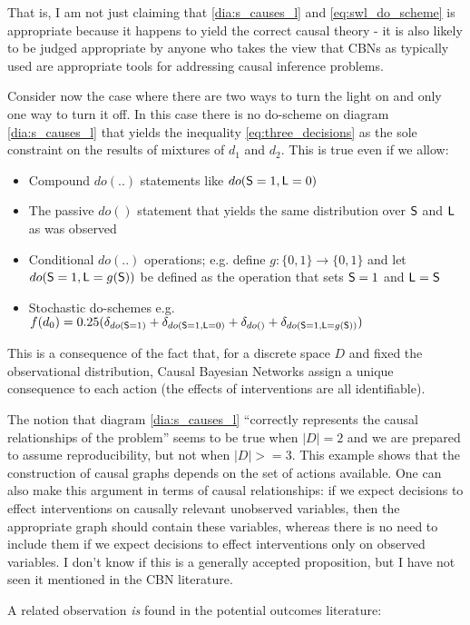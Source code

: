 That is, I am not just claiming that \ref{dia:s_causes_l} and \ref{eq:swl_do_scheme} is appropriate because it happens to yield the correct causal theory - it is also likely to be judged appropriate by anyone who takes the view that CBNs as typically used are appropriate tools for addressing causal inference problems.

Consider now the case where there are two ways to turn the light on and only one way to turn it off. In this case there is no do-scheme on diagram \ref{dia:s_causes_l} that yields the inequality \ref{eq:three_decisions} as the sole constraint on the results of mixtures of $d_1$ and $d_2$. This is true even if we allow:
\begin{itemize}
	\item Compound $do(..)$ statements like $do(\mathsf{S}=1,\mathsf{L}=0)$
	\item The passive $do()$ statement that yields the same distribution over $\mathsf{S}$ and $\mathsf{L}$ as was observed
	\item Conditional $do(..)$ operations; e.g. define $g:\{0,1\}\to \{0,1\}$ and let $do(\mathsf{S}=1,\mathsf{L}=g(\mathsf{S}))$ be defined as the operation that sets $\mathsf{S}=1$ and $\mathsf{L}=\mathsf{S}$ 
	\item Stochastic do-schemes e.g. $f(d_0) = 0.25(\delta_{do(\mathsf{S}=1)} + \delta_{do(\mathsf{S}=1,\mathsf{L}=0)} + \delta_{do()} + \delta_{do(\mathsf{S}=1,\mathsf{L}=g(\mathsf{S}))})$
\end{itemize}
This is a consequence of the fact that, for a discrete space $D$ and fixed the observational distribution, Causal Bayesian Networks assign a unique consequence to each action (the effects of interventions are all identifiable).

The notion that diagram \ref{dia:s_causes_l} ``correctly represents the causal relationships of the problem'' seems to be true when $|D|=2$ and we are prepared to assume reproducibility, but not when $|D|>=3$. This example shows that the construction of causal graphs depends on the set of actions available. One can also make this argument in terms of causal relationships: if we expect decisions to effect interventions on causally relevant unobserved variables, then the appropriate graph should contain these variables, whereas there is no need to include them if we expect decisions to effect interventions only on observed variables. I don't know if this is a generally accepted proposition, but I have not seen it mentioned in the CBN literature.

A related observation \emph{is} found in the potential outcomes literature:

